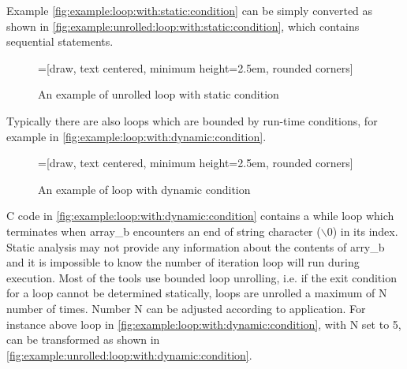 Example \autoref{fig:example:loop:with:static:condition} can be simply converted as shown in \autoref{fig:example:unrolled:loop:with:static:condition}, which contains sequential statements.
\begin{figure}[htbp]
    \centering
    =[draw, text centered, minimum height=2.5em, rounded corners]

   \caption{An example of unrolled loop with static condition}
   \label{fig:example:unrolled:loop:with:static:condition}
\end{figure}

Typically there are also loops which are bounded by run-time conditions, for example in \autoref{fig:example:loop:with:dynamic:condition}.
\begin{figure}[htbp]
    \centering
    =[draw, text centered, minimum height=2.5em, rounded corners]

   \caption{An example of loop with dynamic condition}
   \label{fig:example:loop:with:dynamic:condition}
\end{figure}

C code in \autoref{fig:example:loop:with:dynamic:condition} contains a while loop which terminates when array\_b encounters an end of string character ($\backslash 0$) in its index. Static analysis may not provide any information about the contents of arry\_b and it is impossible to know the number of iteration loop will run during execution. Most of the tools use bounded loop unrolling, i.e. if the exit condition for a loop cannot be determined statically, loops are unrolled a maximum of N number of times. Number N can be adjusted according to application. For instance above loop in \autoref{fig:example:loop:with:dynamic:condition}, with N set to 5, can be transformed as shown in \autoref{fig:example:unrolled:loop:with:dynamic:condition}.

